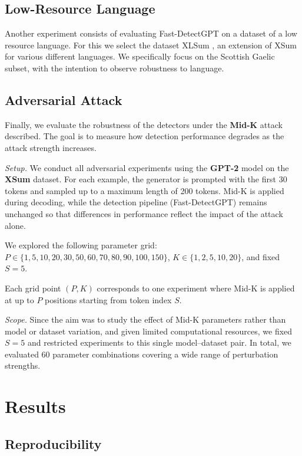 \documentclass[11pt]{article}
\begin{document}
\subsection{Low-Resource Language}
Another experiment consists of evaluating Fast-DetectGPT on a dataset of a low resource language. For this we select the dataset {XL}Sum \cite{xlsum}, an extension of XSum for various different languages. We specifically focus on the Scottish Gaelic subset, with the intention to observe robustness to language.

\subsection{Adversarial Attack}
Finally, we evaluate the robustness of the detectors under the \textbf{Mid-K} attack described. The goal is to measure how detection performance degrades as the attack strength increases.

\textit{Setup.} We conduct all adversarial experiments using the \textbf{GPT-2} model on the \textbf{XSum} dataset. For each example, the generator is prompted with the first 30 tokens and sampled up to a maximum length of 200 tokens. Mid-K is applied during decoding, while the detection pipeline (Fast-DetectGPT) remains unchanged so that differences in performance reflect the impact of the attack alone.

We explored the following parameter grid: 
$P \in \{1,5,10,20,30,50,60,70,80,90,100,150\}$, 
$K \in \{1,2,5,10,20\}$, and fixed $S=5$.

Each grid point $(P,K)$ corresponds to one experiment where Mid-K is applied at up to $P$ positions starting from token index $S$. 

\textit{Scope.} Since the aim was to study the effect of Mid-K parameters rather than model or dataset variation, and given limited computational resources, we fixed $S=5$ and restricted experiments to this single model–dataset pair. In total, we evaluated 60 parameter combinations covering a wide range of perturbation strengths.

\section{Results}

\subsection{Reproducibility}
\end{document}
